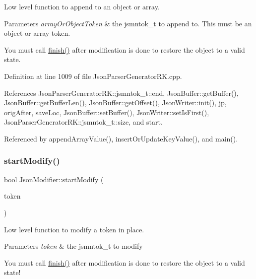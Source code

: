 Low level function to append to an object or array. 


\begin{DoxyParams}{Parameters}
{\em array\+Or\+Object\+Token} & the jsmntok\+\_\+t to append to. This must be an object or array token.\\
\hline
\end{DoxyParams}
You must call \hyperlink{class_json_modifier_ae531232fa98f72eea8ea6ba07c065497}{finish()} after modification is done to restore the object to a valid state. 

Definition at line 1009 of file Json\+Parser\+Generator\+R\+K.\+cpp.



References Json\+Parser\+Generator\+R\+K\+::jsmntok\+\_\+t\+::end, Json\+Buffer\+::get\+Buffer(), Json\+Buffer\+::get\+Buffer\+Len(), Json\+Buffer\+::get\+Offset(), Json\+Writer\+::init(), jp, orig\+After, save\+Loc, Json\+Buffer\+::set\+Buffer(), Json\+Writer\+::set\+Is\+First(), Json\+Parser\+Generator\+R\+K\+::jsmntok\+\_\+t\+::size, and start.



Referenced by append\+Array\+Value(), insert\+Or\+Update\+Key\+Value(), and main().

\mbox{\label{class_json_modifier_aa53d66feb3cd13165f3a2eac012a123b}} 
\subsubsection{\texorpdfstring{start\+Modify()}{startModify()}}
{\footnotesize\ttfamily bool Json\+Modifier\+::start\+Modify (\begin{DoxyParamCaption}\item[{const \hyperlink{struct_json_parser_generator_r_k_1_1jsmntok__t}{Json\+Parser\+Generator\+R\+K\+::jsmntok\+\_\+t} $\ast$}]{token }\end{DoxyParamCaption})}



Low level function to modify a token in place. 


\begin{DoxyParams}{Parameters}
{\em token} & the jsmntok\+\_\+t to modify\\
\hline
\end{DoxyParams}
You must call \hyperlink{class_json_modifier_ae531232fa98f72eea8ea6ba07c065497}{finish()} after modification is done to restore the object to a valid state!

